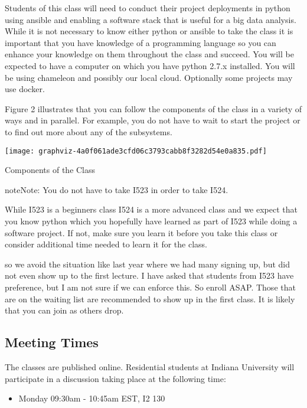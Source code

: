 Students of this class will need to conduct their project deployments
in python using ansible and enabling a software stack that is useful
for a big data analysis. While it is not necessary to know either
python or ansible to take the class it is important that you have
knowledge of a programming language so you can enhance your knowledge
on them throughout the class and succeed. You will be expected to have
a computer on which you have python 2.7.x installed.  You will be
using chameleon and possibly our local cloud. Optionally some projects
may use docker.

Figure 2 illustrates that you can follow the components of the class
in a variety of ways and in parallel. For example, you do not have to
wait to start the project or to find out more about any of the
subsystems.

\texttt{[image: graphviz-4a0f061ade3cfd06c3793cabb8f3282d54e0a835.pdf]}

 Components of the Class

\begin{sphinxadmonition}{note}{Note:}
You do not have to take I523 in order to take I524.

 While I523 is a
beginners class I524 is a more advanced class and we expect that
you know python which you hopefully have learned as part of
I523 while doing a software project. If not, make sure you
learn it before you take this class or consider
 additional time needed to learn it for the
class.

 so we avoid the
situation like last year where we had many signing up, but
did not even show up to the first lecture. I have asked that
students from I523 have preference, but I am not sure if we
can enforce this. So enroll ASAP. Those that are on the
waiting list are recommended to show up in the first
class. It is likely that you can join as others drop.
\end{sphinxadmonition}


\subsection{Meeting Times}
\label{\detokenize{i524/index:meeting-times}}\label{\detokenize{i524/index:index-2}}
The classes are published online. Residential students at Indiana
University will participate in a discussion taking place at the
following time:
\begin{itemize}
\item {} 
Monday 09:30am - 10:45am EST, I2 130

\end{itemize}

